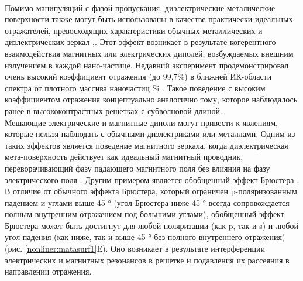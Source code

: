 \\
\hspace*{2mm}
Помимо манипуляций с фазой пропускания, диэлектрические металические поверхности также могут быть использованы в качестве практически идеальных отражателей, превосходящих характеристики обычных металлических и диэлектрических зеркал \cite{dielMetaPolarCon},\cite{nearRefcLayer}.  Этот эффект возникает в результате когерентного взаимодействия магнитных или электрических диполей, возбуждаемых внешним излучением в каждой нано-частице. Недавний эксперимент продемонстрировал очень высокий коэффициент отражения (до 99,7\%) в ближней ИК-области спектра от плотного массива наночастиц Si \cite{dielMetaPolarCon}. Такое поведение с высоким коэффициентом отражения концептуально аналогично тому, которое наблюдалось ранее в высококонтрастных решетках с субволновой длиной. 
\\
\hspace*{2mm}
Мешающие электрические и магнитные диполи могут привести к явлениям, которые нельзя наблюдать с обычными диэлектриками или металлами. Одним из таких эффектов является поведение магнитного зеркала, когда диэлектрическая мета-поверхность действует как идеальный магнитный проводник, переворачивающий фазу падающего магнитного поля без влияния на фазу электрического поля \cite{optMagnMirr}. Другим примером является обобщенный эффект Брюстера \cite{delMetRefctPolar}. В отличие от обычного эффекта Брюстера, который ограничен p-поляризованным падением и углами выше 45 ° (угол Брюстера ниже 45 ° всегда сопровождается полным внутренним отражением под большими углами), обобщенный эффект Брюстера может быть достигнут для любой поляризации (как p, так и s) и любой угол падения (как ниже, так и выше 45 ° без полного внутреннего отражения) (рис. \ref{nonliner:matasurf1}E). Оно возникает в результате интерференции электрических и магнитных резонансов в решетке и подавления их рассеяния в направлении отражения.

